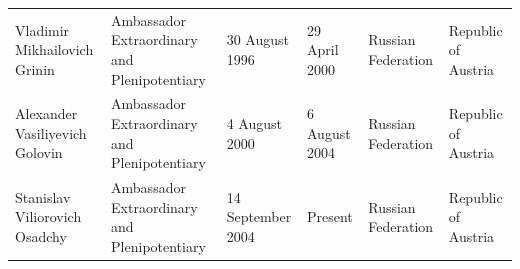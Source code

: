 \documentclass{article}
\begin{document}
\begin{tabular}{llllll}
Vladimir Mikhailovich Grinin & Ambassador Extraordinary and Plenipotentiary & 30 August 1996 & 29 April 2000 & Russian Federation & Republic of Austria \\
Alexander Vasiliyevich Golovin & Ambassador Extraordinary and Plenipotentiary & 4 August 2000 & 6 August 2004 & Russian Federation & Republic of Austria \\
Stanislav Viliorovich Osadchy & Ambassador Extraordinary and Plenipotentiary & 14 September 2004 & Present & Russian Federation & Republic of Austria \\
\bottomrule
\end{tabular}
\end{document}
